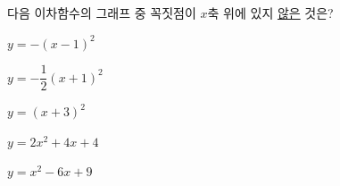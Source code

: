 다음 이차함수의 그래프 중 꼭짓점이 $x$축 위에 있지 \underline{않은} 것은?
\begin{choicesii}{\rule[-3ex]{0pt}{8ex}$y=-(x-1)^2$}{\rule[-3ex]{0pt}{8ex}$y=-\dfrac{1}{2}(x+1)^2$}{\rule[-3ex]{0pt}{8ex}$y=(x+3)^2$}{\rule[-3ex]{0pt}{8ex}$y=2x^2+4x+4$}{\rule[-3ex]{0pt}{8ex}$y=x^2-6x+9$}\end{choicesii}
